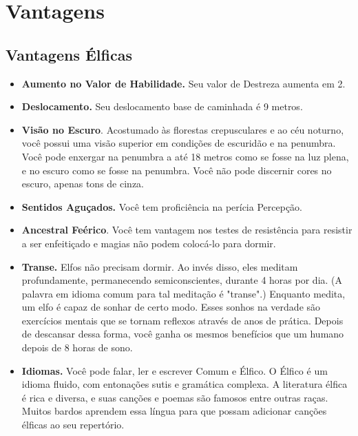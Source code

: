 \documentclass[a4paper,12p]{book}
\begin{document}
	\section{Vantagens}
	\begin{multicols}{2}
	\subsection{Vantagens Élficas}
		\begin{itemize}
			\item \textbf{Aumento no Valor de Habilidade.} Seu valor de
			Destreza aumenta em 2.
			\item \textbf{Deslocamento.} Seu deslocamento base de caminhada
			é 9 metros.
			\item \textbf{Visão no Escuro}. Acostumado às florestas
			crepusculares e ao céu noturno, você possui uma visão
			superior em condições de escuridão e na penumbra. Você
			pode enxergar na penumbra a até 18 metros como se fosse
			na luz plena, e no escuro como se fosse na penumbra.
			Você não pode discernir cores no escuro, apenas tons de
			cinza.
			\item \textbf{Sentidos Aguçados. }Você tem proficiência na perícia
			Percepção.
			\item \textbf{Ancestral Feérico}. Você tem vantagem nos testes de
			resistência para resistir a ser enfeitiçado e magias não
			podem colocá-lo para dormir.
			\item \textbf{Transe.} Elfos não precisam dormir. Ao invés disso,
			eles meditam profundamente, permanecendo
			semiconscientes, durante 4 horas por dia. (A palavra em
			idioma comum para tal meditação é "transe".) Enquanto
			medita, um elfo é capaz de sonhar de certo modo. Esses
			sonhos na verdade são exercícios mentais que se tornam
			reflexos através de anos de prática. Depois de descansar
			dessa forma, você ganha os mesmos benefícios que um
			humano depois de 8 horas de sono.
			\item \textbf{Idiomas.} Você pode falar, ler e escrever Comum e
			Élfico. O Élfico é um idioma fluido, com entonações sutis e
			gramática complexa. A literatura élfica é rica e diversa, e
			suas canções e poemas são famosos entre outras raças.
			Muitos bardos aprendem essa língua para que possam
			adicionar canções élficas ao seu repertório.
		\end{itemize}
	

\end{multicols}
\end{document}
